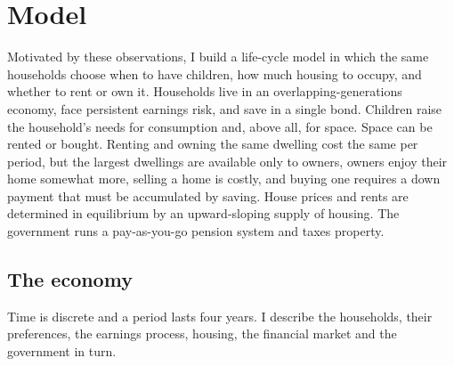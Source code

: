 \providecommand{\mocktodo}[1]{\textcolor{red}{[TODO: #1]}}

\section{Model}
\label{sec:model-oct05}

Motivated by these observations, I build a life-cycle model in which the same
households choose when to have children, how much housing to occupy, and
whether to rent or own it. Households live in an overlapping-generations
economy, face persistent earnings risk, and save in a single bond. Children
raise the household's needs for consumption and, above all, for space. Space
can be rented or bought. Renting and owning the same dwelling cost the same per
period, but the largest dwellings are available only to owners, owners enjoy
their home somewhat more, selling a home is costly, and buying one requires a
down payment that must be accumulated by saving. House prices and rents are
determined in equilibrium by an upward-sloping supply of housing. The
government runs a pay-as-you-go pension system and taxes property.

\subsection{The economy}

Time is discrete and a period lasts four years.
I describe the households, their preferences, the earnings process, housing,
the financial market and the government in turn.

